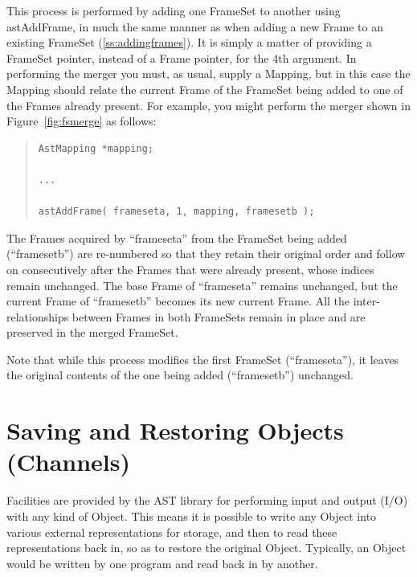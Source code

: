 \documentclass[twoside,11pt]{article}
\newcommand{\htmlref}[2]{#1}
\newcommand{\secref}[1]{\S\ref{#1}}
\renewcommand{\secref}[1]{\ref{#1}}
\begin{document}
This process is performed by adding one FrameSet to another using
astAddFrame, in much the same manner as when adding a new Frame to an
existing FrameSet (\secref{ss:addingframes}). It is simply a matter of
providing a FrameSet pointer, instead of a Frame pointer, for the 4th
argument. In performing the merger you must, as usual, supply a
Mapping, but in this case the Mapping should relate the current Frame
of the FrameSet being added to one of the Frames already present. For
example, you might perform the merger shown in
Figure~\ref{fig:fsmerge} as follows:

\begin{quote}
\small
\begin{verbatim}
AstMapping *mapping;

...

astAddFrame( frameseta, 1, mapping, framesetb );
\end{verbatim}
\normalsize
\end{quote}

The Frames acquired by ``frameseta'' from the FrameSet being added
(``framesetb'') are re-numbered so that they retain their original
order and follow on consecutively after the Frames that were already
present, whose indices remain unchanged. The base Frame of
``frameseta'' remains unchanged, but the current Frame of
``framesetb'' becomes its new current Frame. All the
inter-relationships between Frames in both FrameSets remain in place
and are preserved in the merged FrameSet.

Note that while this process modifies the first FrameSet
(``frameseta''), it leaves the original contents of the one being
added (``framesetb'') unchanged.

%

\cleardoublepage
%
\section{\label{ss:channels}Saving and Restoring Objects (Channels)}

Facilities are provided by the AST library for performing input and
output (I/O) with any kind of \htmlref{Object}{Object}. This means it is possible
to write any Object into various external representations for
storage, and then to read these representations back in, so as to
restore the original Object. Typically, an Object would be written by
one program and read back in by another.
\end{document}
